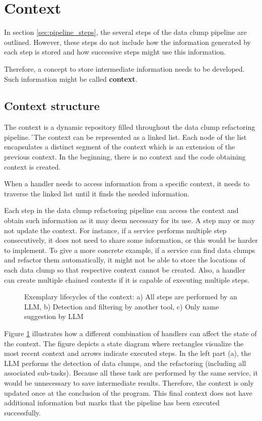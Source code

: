 \section{Context}\label{sec:context}
In section \ref{sec:pipeline_steps}, the several steps of the data clump pipeline are outlined. However, these steps do not include how the information generated by each step is stored and how successive steps might use this information.

Therefore, a concept to store intermediate information needs to be developed. Such information might be called \textbf{context}.
\subsection{Context structure}
The context is a  dynamic repository filled throughout the data clump refactoring pipeline.´The context can be represented as a linked list. Each node of the list encapsulates a distinct segment of the context which is an extension of the previous context. In the beginning, there is no context and the code obtaining context is created.

When a handler needs to access information from a specific context, it needs to traverse the linked list until it finds the needed information. 


Each step in the data clump refactoring pipeline can access the context and obtain such information as it may deem necessary for its use. A step may or may not update the context. For instance, if a service performs multiple step consecutively, it does not need to share  some information, or this would be harder to implement. To give a more concrete example, if a service can find data clumps and refactor them automatically, it might not be able to store the locations of each data clump so that respective context cannot be created. Also, a handler can create multiple chained contexts if it is capable of executing multiple steps. 

\begin{figure}
   
\caption{Exemplary lifecycles of the context: a) All steps are performed by an \ac{LLM}, b) Detection and filtering by another tool, c) Only name suggestion by \ac{LLM}}
\label{fig:context_lifecycle}
\end{figure}

Figure \ref{fig:context_lifecycle} illustrates how a different combination of handlers can affect the state of the context. The figure depicts a state diagram where rectangles visualize the most recent context and arrows indicate executed steps.  In the left part (a), the \ac{LLM} performs the detection of data clumps, and the refactoring (including all associated sub-tasks). Because all these task are performed by the same service, it would be unnecessary to save intermediate results. Therefore, the context is only updated once at the conclusion of the program. This final context does not have additional information but marks that the pipeline has been executed successfully.
 



